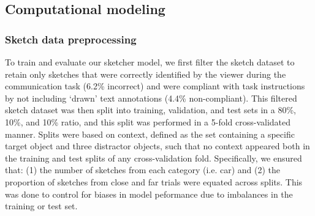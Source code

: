 \documentclass[9pt,twocolumn,twoside]{pnas-new}
\begin{document}
{%

\subsection*{Computational modeling}



\subsubsection*{Sketch data preprocessing} 
To train and evaluate our sketcher model, we first filter the sketch dataset to retain only sketches that were correctly identified by the viewer during the communication task (6.2\% incorrect) and were compliant with task instructions by not including `drawn' text annotations (4.4\% non-compliant). 
This filtered sketch dataset was then split into training, validation, and test sets in a 80\%, 10\%, and 10\% ratio, and this split was performed in a 5-fold cross-validated manner.
Splits were based on context, defined as the set containing a specific target object and three distractor objects, such that no context appeared both in the training and test splits of any cross-validation fold. 
Specifically, we ensured that: (1) the number of sketches from each category (i.e. car) and (2) the proportion of sketches from close and far trials were equated across splits. 
This was done to control for biases in model peformance due to imbalances in the training or test set.

}
\end{document}
